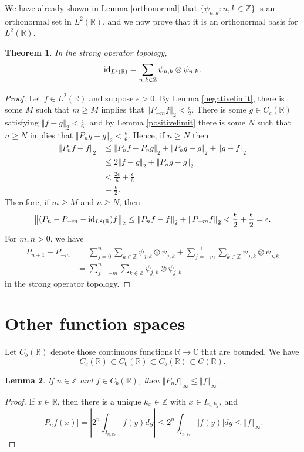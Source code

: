\documentclass{article}
\newcommand{\id}{\ensuremath\mathrm{id}}
\newcommand{\norm}[1]{\left\Vert #1 \right\Vert}
\newtheorem{theorem}{Theorem}
\newtheorem{lemma}[theorem]{Lemma}
\theoremstyle{definition}
\begin{document}
We have already shown in Lemma \ref{orthonormal} that $\{\psi_{n,k}:n,k \in \mathbb{Z}\}$ is an orthonormal set in $L^2(\mathbb{R})$, and we now prove
that it  is an orthonormal basis for
$L^2(\mathbb{R})$. 

\begin{theorem}
In the strong operator topology,
\[
\id_{L^2(\mathbb{R})} = \sum_{n,k \in \mathbb{Z}} \psi_{n,k} \otimes \psi_{n,k}. 
\]
\end{theorem}
\begin{proof}
Let $f \in L^2(\mathbb{R})$ and suppose $\epsilon>0$. 
By Lemma \ref{negativelimit}, there is some $M$ such that $m \geq M$ implies that 
$\norm{P_{-m} f}_2 < \frac{\epsilon}{2}$.
There is some $g \in C_c(\mathbb{R})$ satisfying $\norm{f-g}_2 < \frac{\epsilon}{6}$, and 
 by Lemma \ref{positivelimit} there is some $N$ such that $n \geq N$ implies that $\norm{P_n g-g}_2<\frac{\epsilon}{6}$.
Hence, if $n \geq N$ then
\begin{align*}
\norm{P_nf-f}_2 &\leq \norm{P_nf-P_ng}_2+\norm{P_ng-g}_2+\norm{g-f}_2\\
&\leq2\norm{f-g}_2 + \norm{P_ng-g}_2\\
&<\frac{2\epsilon}{6}+\frac{\epsilon}{6}\\
&=\frac{\epsilon}{2}.
\end{align*}
Therefore, if $m \geq M$ and $n \geq N$, then
\[
\norm{(P_n-P_{-m}-\id_{L^2(\mathbb{R}})f}_2\leq  \norm{P_nf-f}_2 + \norm{P_{-m}f}_2 < \frac{\epsilon}{2}+\frac{\epsilon}{2} = \epsilon.
\]
For $m,n>0$, we have
\begin{align*}
P_{n+1}-P_{-m}&= \sum_{j=0}^n \sum_{k \in \mathbb{Z}} \psi_{j,k} \otimes \psi_{j,k} + \sum_{j=-m}^{-1} \sum_{k \in \mathbb{Z}}
\psi_{j,k} \otimes \psi_{j,k}\\
&=\sum_{j=-m}^n \sum_{k \in \mathbb{Z}} \psi_{j,k} \otimes \psi_{j,k}
\end{align*}
in the strong operator topology.
\end{proof}


\section{Other function spaces}
Let $C_b(\mathbb{R})$ denote those continuous functions $\mathbb{R} \to \mathbb{C}$ that are bounded. We
have
\[
C_c(\mathbb{R}) \subset C_0(\mathbb{R}) \subset C_b(\mathbb{R}) \subset C(\mathbb{R}).
\]

\begin{lemma}
If $n \in \mathbb{Z}$ and $f \in C_b(\mathbb{R})$, then $\norm{P_nf}_\infty \leq \norm{f}_\infty$.
\end{lemma}
\begin{proof}
If $x \in \mathbb{R}$, then
there is a unique $k_x \in \mathbb{Z}$ with $x \in I_{n,k_x}$, and
\[
|P_nf(x)| = \left| 2^n \int_{I_{n,k_x}} f(y) dy \right| \leq 2^n \int_{I_{n,k_x}} |f(y)| dy \leq
 \norm{f}_\infty.
\]
\end{proof}
\end{document}
